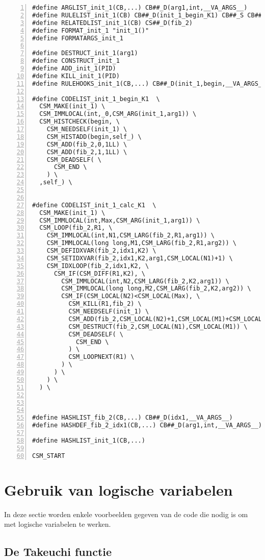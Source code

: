 {\begin{Verbatim}[frame=single,numbers=left]
#define ARGLIST_init_1(CB,...) CB##_D(arg1,int,__VA_ARGS__)
#define RULELIST_init_1(CB) CB##_D(init_1_begin_K1) CB##_S CB##_D(init_1_calc_K1)
#define RELATEDLIST_init_1(CB) CS##_D(fib_2)
#define FORMAT_init_1 "init_1()"
#define FORMATARGS_init_1 

#define DESTRUCT_init_1(arg1) 
#define CONSTRUCT_init_1 
#define ADD_init_1(PID) 
#define KILL_init_1(PID) 
#define RULEHOOKS_init_1(CB,...) CB##_D(init_1,begin,__VA_ARGS__)

#define CODELIST_init_1_begin_K1  \
  CSM_MAKE(init_1) \
  CSM_IMMLOCAL(int,_0,CSM_ARG(init_1,arg1)) \
  CSM_HISTCHECK(begin, \
    CSM_NEEDSELF(init_1) \
    CSM_HISTADD(begin,self_) \
    CSM_ADD(fib_2,0,1LL) \
    CSM_ADD(fib_2,1,1LL) \
    CSM_DEADSELF( \
      CSM_END \
    ) \
  ,self_) \


#define CODELIST_init_1_calc_K1  \
  CSM_MAKE(init_1) \
  CSM_IMMLOCAL(int,Max,CSM_ARG(init_1,arg1)) \
  CSM_LOOP(fib_2,R1, \
    CSM_IMMLOCAL(int,N1,CSM_LARG(fib_2,R1,arg1)) \
    CSM_IMMLOCAL(long long,M1,CSM_LARG(fib_2,R1,arg2)) \
    CSM_DEFIDXVAR(fib_2,idx1,K2) \
    CSM_SETIDXVAR(fib_2,idx1,K2,arg1,CSM_LOCAL(N1)+1) \
    CSM_IDXLOOP(fib_2,idx1,K2, \
      CSM_IF(CSM_DIFF(R1,K2), \
        CSM_IMMLOCAL(int,N2,CSM_LARG(fib_2,K2,arg1)) \
        CSM_IMMLOCAL(long long,M2,CSM_LARG(fib_2,K2,arg2)) \
        CSM_IF(CSM_LOCAL(N2)<CSM_LOCAL(Max), \
          CSM_KILL(R1,fib_2) \
          CSM_NEEDSELF(init_1) \
          CSM_ADD(fib_2,CSM_LOCAL(N2)+1,CSM_LOCAL(M1)+CSM_LOCAL(M2)) \
          CSM_DESTRUCT(fib_2,CSM_LOCAL(N1),CSM_LOCAL(M1)) \
          CSM_DEADSELF( \
            CSM_END \
          ) \
          CSM_LOOPNEXT(R1) \
        ) \
      ) \
    ) \
  ) \



#define HASHLIST_fib_2(CB,...) CB##_D(idx1,__VA_ARGS__) 
#define HASHDEF_fib_2_idx1(CB,...) CB##_D(arg1,int,__VA_ARGS__) 

#define HASHLIST_init_1(CB,...) 

CSM_START
\end{Verbatim}
}

\section{Gebruik van logische variabelen}

In deze sectie worden enkele voorbeelden gegeven van de code die nodig is om met logische variabelen te werken.

\subsection{De Takeuchi functie} \label{sec:tak-cchr}


